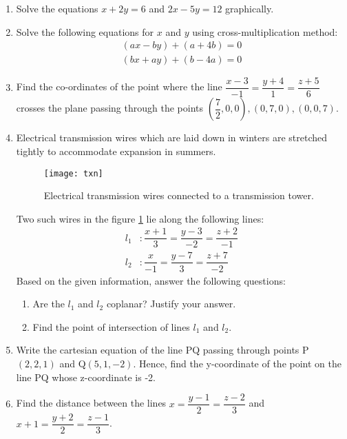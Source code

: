 %
\begin{enumerate}

	\item Solve the equations $x+2y=6$ and $2x-5y=12$ graphically.	

	\item Solve the following equations for $x$ and $y$ using cross-multiplication method:
		\begin{align}
			(ax-by)+(a+4b)=0\\(bx+ay)+(b-4a)=0
		\end{align}

	\item Find the co-ordinates of the point where the line $\dfrac{x-3}{-1}=\dfrac{y+4}{1}=\dfrac{z+5}{6}$ crosses the plane passing through the points $\left(\dfrac{7}{2},0,0\right),(0,7,0),(0,0,7)$.

	\item Electrical transmission wires which are laid down in winters are stretched tightly to accommodate expansion in summers.
		\begin{figure}[H]
			\centering
			\texttt{[image: txn]}
			\caption{Electrical transmission wires connected to a transmission tower.}
			\label{fig:txn1}
		\end{figure}
		Two such wires in the figure \ref{fig:txn1} lie along the following lines:
		\begin{align}
			l_1 &: \dfrac{x+1}{3}=\dfrac{y-3}{-2}=\dfrac{z+2}{-1}\\
			l_2 &: \dfrac{x}{-1}=\dfrac{y-7}{3}=\dfrac{z+7}{-2}
		\end{align}
		Based on the given information, answer the following questions:
		\begin{enumerate}
			\item	Are the $l_1$ and $l_2$ coplanar? Justify your answer.
			\item    Find the point of intersection of lines $l_1$ and $l_2$.
		\end{enumerate}

	\item Write the cartesian equation of the line PQ passing through points P$(2,2,1)$ and Q$(5,1,-2)$. Hence, find the y-coordinate of the point on the line PQ whose z-coordinate is -2.

	\item Find the distance between the lines $x=\dfrac{y-1}{2}=\dfrac{z-2}{3}$ and $x+1=\dfrac{y+2}{2}=\dfrac{z-1}{3}$.
	

\end{enumerate}
